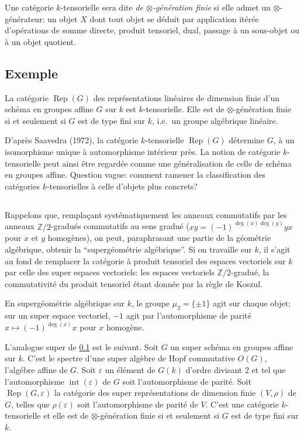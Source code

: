 \documentclass[11pt,a4paper]{article}
\theoremstyle{plain}
\theoremstyle{definition}
\newcommand{\Rep}{\operatorname{Rep}}
\begin{document}
Une cat\'egorie $k$-tensorielle sera dite \emph{de $\otimes$-g\'en\'eration finie} si elle admet un $\otimes$-g\'en\'erateur: un objet $X$ dont tout objet se d\'eduit par application it\'er\'ee d'op\'erations de somme directe, produit tensoriel, dual, passage \`a un sous-objet ou \`a un objet quotient.

\subsection{Exemple}
\label{0.2}

La cat\'egorie $\Rep(G)$ des repr\'esentations lin\'eaires de dimension finie d'un sch\'ema en groupes affine $G$ sur $k$ est $k$-tensorielle. Elle est de $\otimes$-g\'en\'eration finie si et seulement si $G$ est de type fini sur $k$, i.e.~un groupe alg\'ebrique lin\'eaire.

D'apr\`es Saavedra (1972), la cat\'egorie $k$-tensorielle $\Rep(G)$ d\'etermine $G$, \`a un isomorphisme unique \`a automorphisme int\'erieur pr\`es. La notion de cat\'egorie $k$-tensorielle peut ainsi \^etre regard\'ee comme une g\'en\'eralisation de celle de sch\'ema en groupes affine. Question vague: comment ramener la classification des cat\'egories $k$-tensorielles \`a celle d'objets plus concrets?

\subsection{}
\label{0.3}

Rappelons que, rempla\c{c}ant syst\'ematiquement les anneaux commutatifs par les anneaux $\mathbb{Z}/2$-gradu\'es commutatifs au sens gradu\'e ($xy=(-1)^{\deg(x)\deg(y)}yx$ pour $x$ et $y$ homog\`enes), on peut, paraphrasant une partie de la g\'eom\'etrie alg\'ebrique, obtenir la ``superg\'eom\'etrie alg\'ebrique''. Si on travaille sur $k$, il s'agit au fond de remplacer la cat\'egorie \`a produit tensoriel des espaces vectoriels sur $k$ par celle des super espaces vectoriels: les espaces vectoriels $\mathbb{Z}/2$-gradu\'e, la commutativit\'e du produit tensoriel \'etant donn\'ee par la r\`egle de Koszul.

En superg\'eom\'etrie alg\'ebrique sur $k$, le groupe $\mu_2=\{\pm1\}$ agit sur chaque objet; sur un super espace vectoriel, $-1$ agit par l'automorphisme de parit\'e $x\mapsto(-1)^{\deg(x)}x$ pour $x$ homog\`ene.

L'analogue super de \ref{0.2} est le suivant. Soit $G$ un super sch\'ema en groupes affine sur $k$. C'est le spectre d'une super alg\`ebre de Hopf commutative $O(G)$, l'alg\'ebre affine de $G$. Soit $\varepsilon$ un \'el\'ement de $G(k)$ d'ordre divisant $2$ et tel que l'automorphisme $\operatorname{int}(\varepsilon)$ de $G$ soit l'automorphisme de parit\'e. Soit $\Rep(G,\varepsilon)$ la cat\'egorie des super repr\'esentations de dimension finie $(V,\rho)$ de $G$, telles que $\rho(\varepsilon)$ soit l'automorphisme de parit\'e de $V$. C'est une cat\'egorie $k$-tensorielle et elle est de $\otimes$-g\'en\'eration finie si et seulement si $G$ est de type fini sur $k$.
\end{document}
